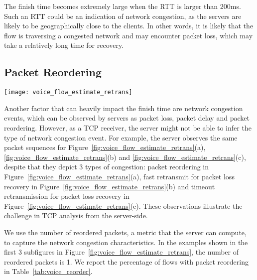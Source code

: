 The finish time becomes extremely large when the RTT is larger than 200ms. Such an RTT could be an indication of network congestion, as the servers are likely to be geographically close to the clients. In other words, it is likely that the flow is traversing a congested network and may encounter packet loss, which may take a relatively long time for recovery.

\subsection{Packet Reordering}
\label{sec:v_pd}


\begin{figure*}[th]
\centering
	\texttt{[image: voice\_flow\_estimate\_retrans]}
\caption{Server could not distinguish packet reordering events, which are (a) packet reordering, (b) fast retransmit, and (c) timeout retransmission. Server may identify some timeout retransmissions as long packet delay (d).}
\label{fig:voice_flow_estimate_retrans}
\end{figure*}

Another factor that can heavily impact the finish time are network congestion events, which can be observed by servers as packet loss, packet delay and packet reordering. However, as a TCP receiver, the server might not be able to infer the type of network congestion event. For example, the server observes the same packet sequences for Figure~\ref{fig:voice_flow_estimate_retrans}(a), \ref{fig:voice_flow_estimate_retrans}(b) and \ref{fig:voice_flow_estimate_retrans}(c), despite that they depict 3 types of congestion: packet reordering in Figure~\ref{fig:voice_flow_estimate_retrans}(a), fast retransmit for packet loss recovery in Figure~\ref{fig:voice_flow_estimate_retrans}(b) and timeout retransmission for packet loss recovery in Figure~\ref{fig:voice_flow_estimate_retrans}(c). These observations illustrate the challenge in TCP analysis from the server-side.

We use the number of reordered packets, a metric that the server can compute, to capture the network congestion characteristics. In the examples shown in the first 3 subfigures in Figure~\ref{fig:voice_flow_estimate_retrans}, the number of reordered packets is 1. %
We report the percentage of flows with packet reordering in Table~\ref{tab:voice_reorder}.

